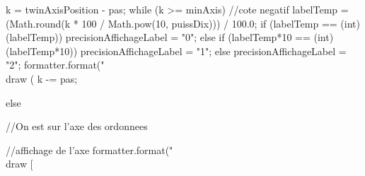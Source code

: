 \begin{code}
\begin{hide}
{{{            k = twinAxisPosition - pas;
            while (k >= minAxis) { //cote negatif
               labelTemp = (Math.round(k * 100 / Math.pow(10, puissDix))) / 100.0;
               if (labelTemp == (int)(labelTemp))
                  precisionAffichageLabel = "0";
               else if (labelTemp*10 == (int)(labelTemp*10))
                  precisionAffichageLabel = "1";
               else
                  precisionAffichageLabel = "2";
               formatter.format("\\draw (%
               k -= pas;
            }
         }

      } else { //On est sur l'axe des ordonnees

         //affichage de l'axe
         formatter.format("\\draw [%

}}
\end{hide}
\end{code}
